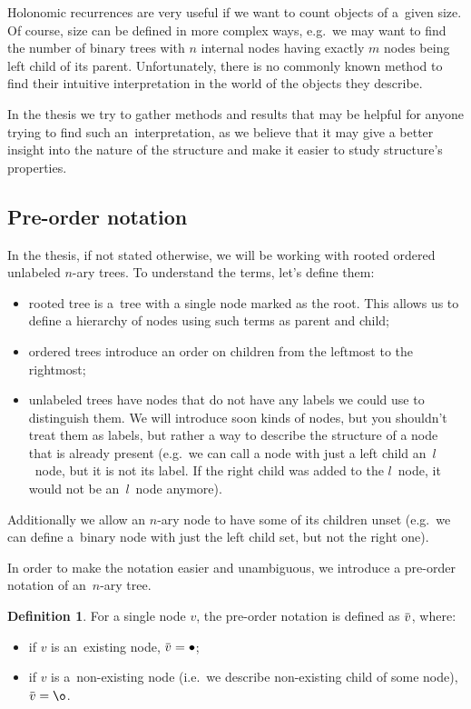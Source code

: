 \documentclass[final]{article}
\theoremstyle{definition}
\newtheorem{definition}{Definition}[subsection]
\theoremstyle{definition}
\theoremstyle{remark}
\newcommand{\ols}[1]{\mskip.5\thinmuskip\overline{\mskip-.5\thinmuskip {#1} \mskip-.5\thinmuskip}\mskip.5\thinmuskip} %
\newcommand{\enc}[1]{\ensuremath{\ols{#1}}}
\DeclareMathOperator{\n}{\bullet}
\DeclareMathOperator{\no}{\o}
\begin{document}
Holonomic recurrences are very useful if we want to count objects of a~given size. Of course, size can be defined in more complex ways, e.g.~we may want to find the number of binary trees with \(n\) internal nodes having exactly \(m\) nodes being left child of its parent. Unfortunately, there is no commonly known method to find their intuitive interpretation in the world of the objects they describe.

In the thesis we try to gather methods and results that may be helpful for anyone trying to find such an~interpretation, as we believe that it may give a better insight into the nature of the structure and make it easier to study structure's properties.

\subsection{Pre-order notation}%
\label{sub:pre_order_notation}

In the thesis, if not stated otherwise, we will be working with rooted ordered unlabeled \(n\)-ary trees. To understand the terms, let's define them:
\begin{itemize}
    \item rooted tree is a~tree with a single node marked as the root. This allows us to define a hierarchy of nodes using such terms as parent and child;
    \item ordered trees introduce an order on children from the leftmost to the rightmost;
    \item unlabeled trees have nodes that do not have any labels we could use to distinguish them. We will introduce soon kinds of nodes, but you shouldn't treat them as labels, but rather a way to describe the structure of a node that is already present (e.g.~we can call a node with just a left child an~\(l\)~node, but it is not its label. If the right child was added to the \(l\)~node, it would not be an~\(l\)~node anymore).
\end{itemize}
Additionally we allow an \(n\)-ary node to have some of its children unset (e.g.~we can define a~binary node with just the left child set, but not the right one).

In order to make the notation easier and unambiguous, we introduce a pre-order notation of an~\(n\)-ary tree.

\begin{definition}
    For a single node \(v\), the pre-order notation is defined as \(\enc{v}\), where:

    \begin{itemize}
        \item if \(v\) is an~existing node, \(\enc{v} = \n\);
        \item if \(v\) is a~non-existing node (i.e.~we describe non-existing child of some node), \(\enc{v} = \no\).
    \end{itemize}
\end{definition}
\end{document}
